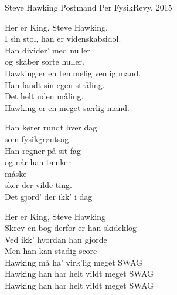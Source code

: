 \begin{song}{Steve Hawking}
  {} %
  {Postmand Per} %
  {} %
  {FysikRevy, 2015} %
  {\NotCCLIed} %

  \begin{SBVerse}
    Her er King, Steve Hawking.\\
    I sin stol, han er videnskabsidol.\\
    Han divider' med nuller\\
    og skaber sorte huller.\\
    Hawking er en temmelig venlig mand.\\\medskip
    Han fandt sin egen stråling.\\
    Det helt uden måling.\\
    Hawking er en meget særlig mand.
  \end{SBVerse}

  \begin{SBChorus}
    Han kører rundt hver dag\\
    som fysikgrøntsag.\\
    Han regner på sit fag\\
    og når han tænker\\
    måske\\
    sker der vilde ting.\\
    Det gjord' der ikk' i dag
  \end{SBChorus}

  \begin{SBVerse}
    Her er King, Steve Hawking\\
    Skrev en bog derfor er han skideklog\\
    Ved ikk' hvordan han gjorde\\
    Men han kan stadig score\\
    Hawking må ha' virk'lig meget SWAG\\
    Hawking han har helt vildt meget SWAG\\
    Hawking han har helt vildt meget SWAG
  \end{SBVerse}
\end{song}